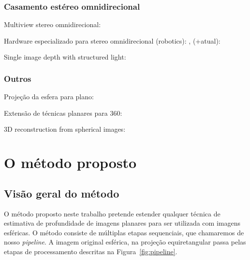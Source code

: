 \documentclass[cic,tc]{iiufrgs}
\begin{document}

\subsection{Casamento estéreo omnidirecional}
Multiview stereo omnidirecional: \citet{Li2001}

Hardware especializado para stereo omnidirecional (robotics): \citet{gluckman1998}, \citet{Koyasu2001} (+atual): \citet{Lin2014}

Single image depth with structured light: \citet{Orghidan2005}

\subsection{Outros}
Projeção da esfera para plano: \citet{sun360}

Extensão de técnicas planares para 360: \citet{flat2sphere}

3D reconstruction from spherical images: \citet{panoContext}

\chapter{O método proposto}

\section{Visão geral do método}

O método proposto neste trabalho pretende estender qualquer técnica de estimativa de profundidade de imagens planares para ser utilizada com imagens esféricas. O método consiste de múltiplas etapas sequenciais, que chamaremos de nosso \textit{pipeline}. A imagem original esférica, na projeção equiretangular passa pelas etapas de processamento descritas na Figura~\ref{fig:pipeline}.
\end{document}
